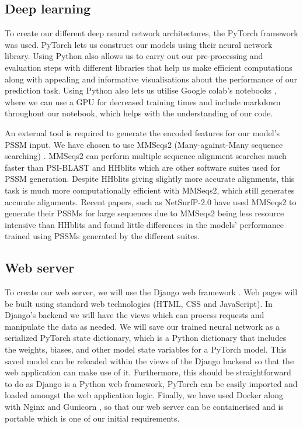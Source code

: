 \documentclass{l4proj}
\begin{document}
\subsection{Deep learning}

To create our different deep neural network architectures, the PyTorch framework \citep{pytorch} was used. PyTorch lets us construct our models using their neural network library. Using Python also allows us to carry out our pre-processing and evaluation steps with different libraries that help us make efficient computations along with appealing and informative visualisations about the performance of our prediction task. Using Python also lets us utilise Google colab’s notebooks \citep{Bisong:19}, where we can use a GPU for decreased training times and include markdown throughout our notebook, which helps with the understanding of our code.

An external tool is required to generate the encoded features for our model's PSSM input. We have chosen to use MMSeqs2 (Many-against-Many sequence searching) \citep{Steinegger:17}. MMSeqs2 can perform multiple sequence alignment searches much faster than PSI-BLAST \citep{Altschul:97} and HHblits \citep{Remmert:12} which are other software suites used for PSSM generation. Despite HHblits giving slightly more accurate alignments, this task is much more computationally efficient with MMSeqs2, which still generates accurate alignments. Recent papers, such as NetSurfP-2.0 \citep{Klausen:19} have used MMSeqs2 to generate their PSSMs for large sequences due to MMSeqs2 being less resource intensive than HHblits and found little differences in the models' performance trained using PSSMs generated by the different suites.

\subsection{Web server}

To create our web server, we will use the Django web framework \citep{Django:05}. Web pages will be built using standard web technologies (HTML, CSS and JavaScript). In Django’s backend we will have the views which can process requests and manipulate the data as needed. We will save our trained neural network as a serialized PyTorch state dictionary, which is a Python dictionary that includes the weights, biases, and other model state variables for a PyTorch model. This saved model can be reloaded within the views of the Django backend so that the web application can make use of it. Furthermore, this should be straightforward to do as Django is a Python web framework, PyTorch can be easily imported and loaded amongst the web application logic. Finally, we have used Docker \citep{Docker:14} along with Nginx \citep{Reese:08} and Gunicorn \citep{gunicorn:wiki}, so that our web server can be containerised and is portable which is one of our initial requirements. 
\end{document}
